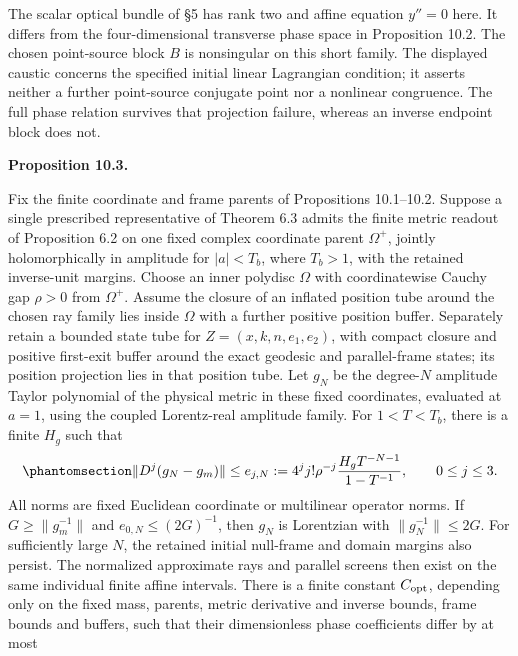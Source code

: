 \documentclass[
  english,
  11pt,
  reqno]{amsart}
\makeatletter
\newcommand{\pandocstatementheading}[1]{%
  \par\addpenalty{\@beginparpenalty}%
  \addvspace{.5\baselineskip plus .2\baselineskip minus .2\baselineskip}%
  {\normalfont\bfseries #1\par}%
  \nobreak\@afterindenttrue\@afterheading
}
\makeatother
\begin{document}
The scalar optical bundle of §5 has rank two and affine equation
\(y''=0\) here. It differs from the four-dimensional transverse phase
space in Proposition 10.2. The chosen point-source block \(B\) is
nonsingular on this short family. The displayed caustic concerns the
specified initial linear Lagrangian condition; it asserts neither a
further point-source conjugate point nor a nonlinear congruence. The
full phase relation survives that projection failure, whereas an inverse
endpoint block does not.

\pandocstatementheading{\protect{}\label{prop:gg-schwarzschild-main-errors}Proposition 10.3.}

Fix the finite coordinate and frame parents of Propositions 10.1--10.2.
Suppose a single prescribed representative of Theorem 6.3 admits the
finite metric readout of Proposition 6.2 on one fixed complex coordinate
parent \(\Omega^+\), jointly holomorphically in amplitude for
\(|a|<T_b\), where \(T_b>1\), with the retained inverse-unit margins.
Choose an inner polydisc \(\Omega\) with coordinatewise Cauchy gap
\(\rho>0\) from \(\Omega^+\). Assume the closure of an inflated position
tube around the chosen ray family lies inside \(\Omega\) with a further
positive position buffer. Separately retain a bounded state tube for
\(Z=(x,k,n,e_1,e_2)\), with compact closure and positive first-exit
buffer around the exact geodesic and parallel-frame states; its position
projection lies in that position tube. Let \(g_N\) be the degree-\(N\)
amplitude Taylor polynomial of the physical metric in these fixed
coordinates, evaluated at \(a=1\), using the coupled Lorentz-real
amplitude family. For \(1<T<T_b\), there is a finite \(H_g\) such that
\begin{equation}\protect\phantomsection\label{eq:gg-schwarzschild-main-taylor-error}{
 \|D^j(g_N-g_m)\|\le e_{j,N}:=
 4^j j!\rho^{-j}\frac{H_gT^{-N-1}}{1-T^{-1}},
 \qquad 0\le j\le3.
}\end{equation} All norms are fixed Euclidean coordinate or multilinear
operator norms. If \(G\ge\|g_m^{-1}\|\) and \(e_{0,N}\le(2G)^{-1}\),
then \(g_N\) is Lorentzian with \(\|g_N^{-1}\|\le2G\). For sufficiently
large \(N\), the retained initial null-frame and domain margins also
persist. The normalized approximate rays and parallel screens then exist
on the same individual finite affine intervals. There is a finite
constant \(C_{\rm opt}\), depending only on the fixed mass, parents,
metric derivative and inverse bounds, frame bounds and buffers, such
that their dimensionless phase coefficients differ by at most
\end{document}
